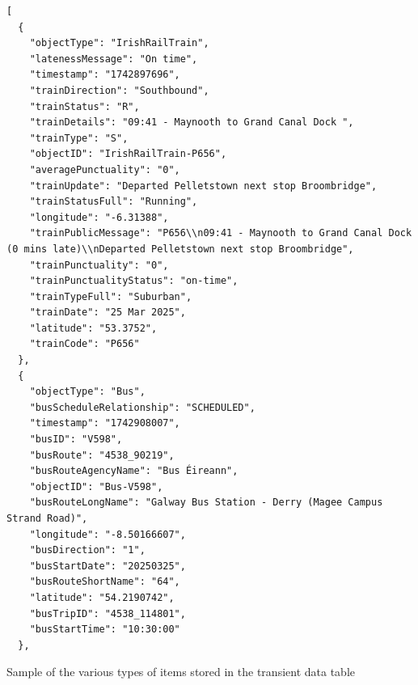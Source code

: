 \documentclass[a4paper,11pt]{report}
\newenvironment{code}{\captionsetup{type=listing}}{}
\begin{document}
\begin{code}
\begin{verbatim}
[
  {
    "objectType": "IrishRailTrain",
    "latenessMessage": "On time",
    "timestamp": "1742897696",
    "trainDirection": "Southbound",
    "trainStatus": "R",
    "trainDetails": "09:41 - Maynooth to Grand Canal Dock ",
    "trainType": "S",
    "objectID": "IrishRailTrain-P656",
    "averagePunctuality": "0",
    "trainUpdate": "Departed Pelletstown next stop Broombridge",
    "trainStatusFull": "Running",
    "longitude": "-6.31388",
    "trainPublicMessage": "P656\\n09:41 - Maynooth to Grand Canal Dock (0 mins late)\\nDeparted Pelletstown next stop Broombridge",
    "trainPunctuality": "0",
    "trainPunctualityStatus": "on-time",
    "trainTypeFull": "Suburban",
    "trainDate": "25 Mar 2025",
    "latitude": "53.3752",
    "trainCode": "P656"
  },
  {
    "objectType": "Bus",
    "busScheduleRelationship": "SCHEDULED",
    "timestamp": "1742908007",
    "busID": "V598",
    "busRoute": "4538_90219",
    "busRouteAgencyName": "Bus Éireann",
    "objectID": "Bus-V598",
    "busRouteLongName": "Galway Bus Station - Derry (Magee Campus Strand Road)",
    "longitude": "-8.50166607",
    "busDirection": "1",
    "busStartDate": "20250325",
    "busRouteShortName": "64",
    "latitude": "54.2190742",
    "busTripID": "4538_114801",
    "busStartTime": "10:30:00"
  },
\end{verbatim}
\caption{Sample of the various types of items stored in the transient data table}
\end{code}
\end{document}
